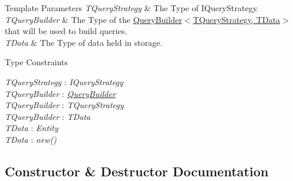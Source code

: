 \begin{DoxyTemplParams}{Template Parameters}
{\em T\+Query\+Strategy} & The Type of I\+Query\+Strategy.\\
\hline
{\em T\+Query\+Builder} & The Type of the \hyperlink{classCqrs_1_1Repositories_1_1Repository_a4447451b7dbcfcd68dfa3fa65a41f357_a4447451b7dbcfcd68dfa3fa65a41f357}{Query\+Builder$<$\+T\+Query\+Strategy, T\+Data$>$} that will be used to build queries.\\
\hline
{\em T\+Data} & The Type of data held in storage.\\
\hline
\end{DoxyTemplParams}
\begin{Desc}
\item[Type Constraints]\begin{description}
\item[{\em T\+Query\+Strategy} : {\em I\+Query\+Strategy}]\item[{\em T\+Query\+Builder} : {\em \hyperlink{classCqrs_1_1Repositories_1_1Repository_a4447451b7dbcfcd68dfa3fa65a41f357_a4447451b7dbcfcd68dfa3fa65a41f357}{Query\+Builder}}]\item[{\em T\+Query\+Builder} : {\em T\+Query\+Strategy}]\item[{\em T\+Query\+Builder} : {\em T\+Data}]\item[{\em T\+Data} : {\em Entity}]\item[{\em T\+Data} : {\em new()}]\end{description}
\end{Desc}


\subsection{Constructor \& Destructor Documentation}
\mbox{\label{classCqrs_1_1Azure_1_1BlobStorage_1_1Repositories_1_1TableStorageRepository_a2c98507c1cdd4ed740a8d881a4e779e1_a2c98507c1cdd4ed740a8d881a4e779e1}} 
